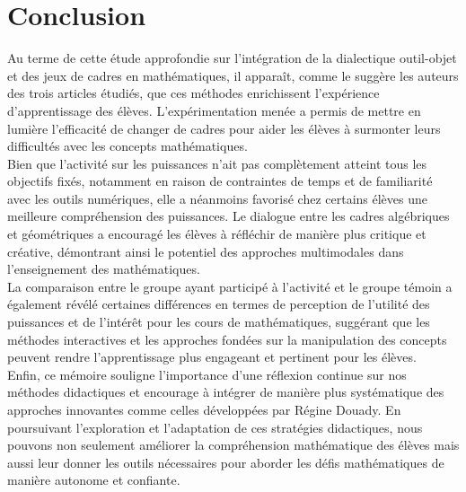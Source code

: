 \section*{Conclusion}

Au terme de cette étude approfondie sur l'intégration de la dialectique outil-objet et des jeux de cadres en mathématiques,
il apparaît,
comme le suggère les auteurs des trois articles étudiés,
que ces méthodes enrichissent l'expérience d'apprentissage des élèves.
L'expérimentation menée a permis de mettre en lumière l'efficacité de changer de cadres pour aider les élèves à surmonter leurs difficultés avec les concepts mathématiques.\\

Bien que l'activité sur les puissances n'ait pas complètement atteint tous les objectifs fixés,
notamment en raison de contraintes de temps et de familiarité avec les outils numériques,
elle a néanmoins favorisé chez certains élèves une meilleure compréhension des puissances.
Le dialogue entre les cadres algébriques et géométriques a encouragé les élèves à réfléchir de manière plus critique et créative,
démontrant ainsi le potentiel des approches multimodales dans l'enseignement des mathématiques.\\

La comparaison entre le groupe ayant participé à l'activité et le groupe témoin a également révélé certaines différences en termes de perception de l'utilité des puissances et de l'intérêt pour les cours de mathématiques,
suggérant que les méthodes interactives et les approches fondées sur la manipulation des concepts peuvent rendre l'apprentissage plus engageant et pertinent pour les élèves.\\

Enfin,
ce mémoire souligne l'importance d'une réflexion continue sur nos méthodes didactiques et encourage à intégrer de manière plus systématique des approches innovantes comme celles développées par Régine Douady.
En poursuivant l'exploration et l'adaptation de ces stratégies didactiques,
nous pouvons non seulement améliorer la compréhension mathématique des élèves mais aussi leur donner les outils nécessaires pour aborder les défis mathématiques de manière autonome et confiante.